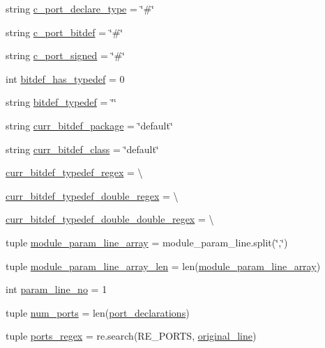 \begin{DoxyCompactItemize}
string \hyperlink{namespaceveripy_a80b7caf2bd3933ac6f3120703f632f77}{c\-\_\-port\-\_\-declare\-\_\-type} = \char`\"{}\#\char`\"{}
\item 
string \hyperlink{namespaceveripy_a9505272117cc42bae0838d650df825ed}{c\-\_\-port\-\_\-bitdef} = \char`\"{}\#\char`\"{}
\item 
string \hyperlink{namespaceveripy_a60d320c655f8b7e2bb3e3169045d9948}{c\-\_\-port\-\_\-signed} = \char`\"{}\#\char`\"{}
\item 
int \hyperlink{namespaceveripy_aef466e074087c0147f0f1fc1d73aa1ab}{bitdef\-\_\-has\-\_\-typedef} = 0
\item 
string \hyperlink{namespaceveripy_aee62390a4a6359636a358bf40e73d4f0}{bitdef\-\_\-typedef} = \char`\"{}\char`\"{}
\item 
string \hyperlink{namespaceveripy_a9213d8895de6b2b39f567f688a696762}{curr\-\_\-bitdef\-\_\-package} = \char`\"{}default\char`\"{}
\item 
string \hyperlink{namespaceveripy_a63f627df880e333c4aa052dcaf2cce59}{curr\-\_\-bitdef\-\_\-class} = \char`\"{}default\char`\"{}
\item 
\hyperlink{namespaceveripy_abbda04be83c86eaa60a0e18caace1444}{curr\-\_\-bitdef\-\_\-typedef\-\_\-regex} = \textbackslash{}
\item 
\hyperlink{namespaceveripy_afec338099217bb624d104ae82fa12569}{curr\-\_\-bitdef\-\_\-typedef\-\_\-double\-\_\-regex} = \textbackslash{}
\item 
\hyperlink{namespaceveripy_af012741317b6a900adf187c07021b594}{curr\-\_\-bitdef\-\_\-typedef\-\_\-double\-\_\-double\-\_\-regex} = \textbackslash{}
\item 
tuple \hyperlink{namespaceveripy_aee8dfa1620d81a57b55d941b6bc353e9}{module\-\_\-param\-\_\-line\-\_\-array} = module\-\_\-param\-\_\-line.\-split(\char`\"{},\char`\"{})
\item 
tuple \hyperlink{namespaceveripy_a7dd3d81c188bf962f2192d44030c6c2f}{module\-\_\-param\-\_\-line\-\_\-array\-\_\-len} = len(\hyperlink{namespaceveripy_aee8dfa1620d81a57b55d941b6bc353e9}{module\-\_\-param\-\_\-line\-\_\-array})
\item 
int \hyperlink{namespaceveripy_a980086a5e8762e72c5a2804ac1901c71}{param\-\_\-line\-\_\-no} = 1
\item 
tuple \hyperlink{namespaceveripy_a1a9f35e27689bee768d00ee633d9b263}{num\-\_\-ports} = len(\hyperlink{namespaceveripy_a99fccb7245b05a502fd01a6cd7ed1c22}{port\-\_\-declarations})
\item 
tuple \hyperlink{namespaceveripy_a6bbb38d63d1a7dca8d7fe54bfcd9e40e}{ports\-\_\-regex} = re.\-search(R\-E\-\_\-\-P\-O\-R\-T\-S, \hyperlink{namespaceveripy_ab15a6bb1f76d3b0db1c63066479489eb}{original\-\_\-line})

\end{DoxyCompactItemize}
